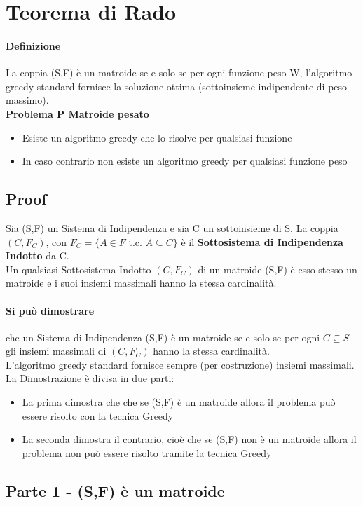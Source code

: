 \section{Teorema di Rado}
\paragraph*{Definizione} La coppia (S,F) è un matroide se e solo se per ogni funzione peso W,
l'algoritmo greedy standard fornisce la soluzione ottima (sottoinsieme indipendente di peso massimo).\\
\textbf{Problema P \ra Matroide pesato}
\begin{itemize}
    \item Esiste un algoritmo greedy che lo risolve per qualsiasi funzione
    \item In caso contrario \ra non esiste un algoritmo greedy per qualsiasi funzione peso
\end{itemize}
\subsection{Proof}
Sia (S,F) un Sistema di Indipendenza e sia C un sottoinsieme di S. La coppia $(C,F_C)$,
con $F_C=\{A \in F \text{ t.c. } A \subseteq C \}$ è il \textbf{Sottosistema di Indipendenza Indotto}
da C.\\
Un qualsiasi Sottosistema Indotto $(C, F_C)$ di un matroide (S,F) è esso stesso un
matroide e i suoi insiemi massimali hanno la stessa cardinalità.
\paragraph*{Si può dimostrare} che un Sistema di Indipendenza (S,F) è un matroide se e solo se
per ogni $C \subseteq S$ gli insiemi massimali di $(C, F_C)$ hanno la stessa cardinalità.\\
L'algoritmo greedy standard fornisce sempre (per costruzione) insiemi massimali.\\
La Dimostrazione è divisa in due parti:
\begin{itemize}
    \item La prima dimostra che che se (S,F) è un matroide allora il problema può essere risolto
    con la tecnica Greedy
    \item La seconda dimostra il contrario, cioè che se (S,F) non è un matroide allora il problema
    non può essere risolto tramite la tecnica Greedy
\end{itemize}
\subsection{Parte 1 - (S,F) è un matroide}
